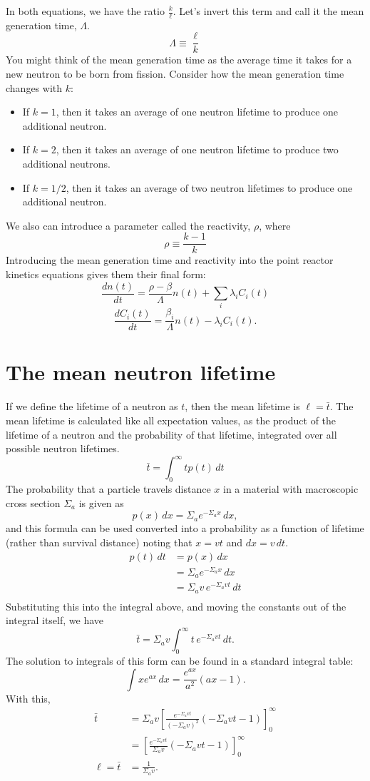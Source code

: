 \documentclass{report}
\begin{document}
In both equations, we have the ratio $\frac{k}{\ell}$. Let's invert this term and call it the mean generation time, $\Lambda$. 
$$ \Lambda \equiv \frac{\ell}{k} $$
You might think of the mean generation time as the average time it takes for a new neutron to be born from fission. Consider how the mean generation time changes with $k$:
\begin{itemize}
\item If $k=1$, then it takes an average of one neutron lifetime to produce one additional neutron.
\item If $k=2$, then it takes an average of one neutron lifetime to produce two additional neutrons.
\item If $k=1/2$, then it takes an average of two neutron lifetimes to produce one additional neutron.
\end{itemize}
We also can introduce a parameter called the reactivity, $\rho$, where
$$ \rho \equiv \frac{k-1}{k} $$
Introducing the mean generation time and reactivity into the point reactor kinetics equations gives them their final form:
$$ \frac{dn(t)}{dt} = \frac{\rho-\beta}{\Lambda}n(t) + \sum_i \lambda_i C_i(t) $$
$$ \frac{dC_i(t)}{dt} =  \frac{\beta_i}{\Lambda} n(t) - \lambda_i C_i(t) .$$



\newpage
\section*{The mean neutron lifetime}
\label{meanlifetime}
If we define the lifetime of a neutron as $t$, then the mean lifetime is $\ell = \bar{t}$. The mean lifetime is calculated like all expectation values, as the product of the lifetime of a neutron and the probability of that lifetime, integrated over all possible neutron lifetimes.
$$\bar{t} = \int_0^{\infty} t p(t) \, dt $$
The probability that a particle travels distance $x$ in a material with macroscopic cross section $\Sigma_a$ is given as
$$ p(x) \, dx = \Sigma_a e^{-\Sigma_a x} \, dx ,$$		 									
and this formula can be used converted into a probability as a function of lifetime (rather than survival distance) noting that $x = vt$ and $dx = v\,dt$. 
\begin{align*}
p(t) \, dt	&= p(x) \, dx \\
			&= \Sigma_a e^{-\Sigma_a x} \, dx \\
			&= \Sigma_a v \, e^{-\Sigma_a vt} \, dt \\
\end{align*}
Substituting this into the integral above, and moving the constants out of the integral itself, we have
$$ \bar{t} = \Sigma_a v\int_0^{\infty} t \, e^{-\Sigma_a vt} \, dt .$$
The solution to integrals of this form can be found in a standard integral table:
$$ \int x e^{ax} \, dx = \frac{e^{ax}}{a^2}(ax-1) .$$   
With this, 
\begin{align*}
\bar{t}	&= \Sigma_a v \left[ \frac{e^{-\Sigma_a vt}}{\left(-\Sigma_a v\right)^2}(-\Sigma_a v t-1) \right]_0^{\infty} \\
		&= \left[ \frac{e^{-\Sigma_a vt}}{\Sigma_a v}(-\Sigma_a v t-1) \right]_0^{\infty} \\
\ell = \bar{t}	&= \frac{1}{\Sigma_a v} . \end{align*}
\end{document}
